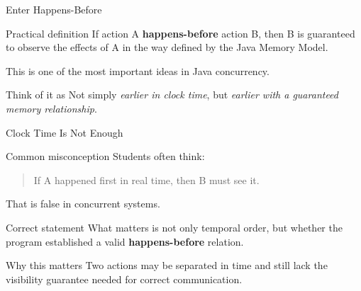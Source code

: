 \documentclass[aspectratio=169,11pt]{beamer}
\begin{document}
	\begin{frame}{Enter Happens-Before}
		\begin{block}{Practical definition}
			If action A \textbf{happens-before} action B, then B is guaranteed to observe the effects of A in the way defined by the Java Memory Model.
		\end{block}
		
		\vspace{0.3cm}
		
		This is one of the most important ideas in Java concurrency.
		
		\vspace{0.3cm}
		
		\begin{exampleblock}{Think of it as}
			Not simply \emph{earlier in clock time}, but  
			\emph{earlier with a guaranteed memory relationship}.
		\end{exampleblock}
	\end{frame}
	
	\begin{frame}{Clock Time Is Not Enough}
		\begin{alertblock}{Common misconception}
			Students often think:
			\begin{quote}
				If A happened first in real time, then B must see it.
			\end{quote}
		\end{alertblock}
		
		\vspace{0.3cm}
		
		That is false in concurrent systems.
		
		\vspace{0.3cm}
		
		\begin{block}{Correct statement}
			What matters is not only temporal order, but whether the program established a valid \textbf{happens-before} relation.
		\end{block}
		
		\vspace{0.25cm}
		
		\begin{exampleblock}{Why this matters}
			Two actions may be separated in time and still lack the visibility guarantee needed for correct communication.
		\end{exampleblock}
	\end{frame}
	
\end{document}
